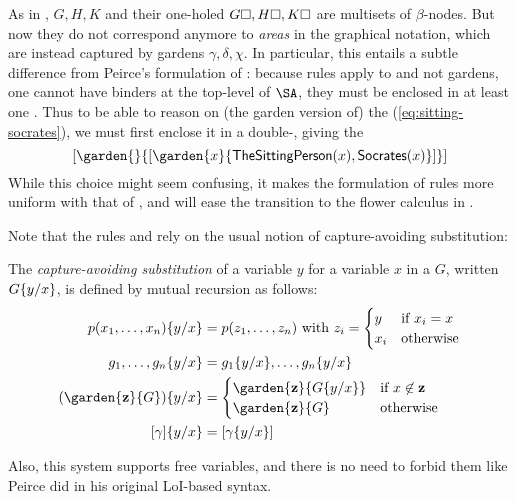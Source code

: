 \begin{scope}
\begin{remark}
  As in ,  $G, H, K$ and their one-holed 
  $G\square, H\square, K\square$ are multisets of $\beta$-nodes. But now they do not
  correspond anymore to \emph{areas} in the graphical notation, which are
  instead captured by gardens $\gamma, \delta, \chi$. In particular, this
  entails a subtle difference from Peirce's formulation of : because
  rules apply to  and not gardens, one cannot have binders at the
  top-level of $\SA$, they must be enclosed in at least one . Thus to be able
  to reason on (the garden version of) the  (\ref{eq:sitting-socrates}), we
  must first enclose it in a double-, giving the 
  $$[\garden{{}}{[\garden{x}{\mathsf{TheSittingPerson}(x),\mathsf{Socrates}(x)}]}]$$
  While this choice might seem confusing, it makes the formulation of rules more
  uniform with that of , and will ease the transition to the flower
  calculus in .
\end{remark}

Note that the rules  and  rely on the usual notion
of capture-avoiding substitution:

\begin{definition}[Substitution]
  The \emph{capture-avoiding substitution} of a variable $y$ for a variable $x$
  in a  $G$, written $G \{ y / x \}$, is defined by mutual
  recursion as follows:
  \begin{align*}
    \subst{p(x_1,\ldots,x_n)}{y}{x} &= p(z_1, \ldots, z_n) \text{ with } z_i = \begin{cases}
      y &\text{if $x_i = x$} \\
      x_i &\text{otherwise}
    \end{cases} \\
    \subst{g_1, \ldots, g_n}{y}{x} &= \subst{g_1}{y}{x}, \ldots, \subst{g_n}{y}{x} \\
    \subst{(\garden{\bz}{G})}{y}{x} &= \begin{cases}
      \garden{\bz}{\subst{G}{y}{x}} &\text{if $x \not\in \bz$} \\
      \garden{\bz}{G} &\text{otherwise}
    \end{cases} \\
    \subst{[\gamma]}{y}{x} &= [\subst{\gamma}{y}{x}]
  \end{align*}
\end{definition}

Also, this system supports free variables, and there is no need to forbid them
like Peirce did in his original LoI-based syntax.

\end{scope}